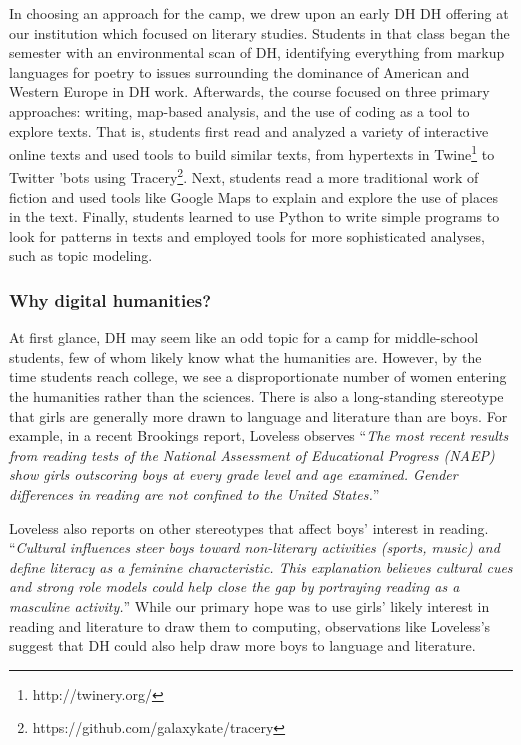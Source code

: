 In choosing an approach for the camp, we drew upon an early DH
DH offering at our institution which focused on literary studies.
Students in that class began the semester with an
environmental scan of DH, identifying everything
from markup languages for poetry to issues surrounding the dominance
of American and Western Europe in DH work. Afterwards, the
course focused on three primary approaches: writing, map-based
analysis, and the use of coding as a tool to explore texts.  That
is, students first read and analyzed a variety of interactive online
texts and used tools to build similar texts, from hypertexts in
Twine\footnote{http://twinery.org/} to Twitter 'bots using
Tracery\footnote{https://github.com/galaxykate/tracery}.  Next,
students read a more traditional work of fiction and used tools
like Google Maps to explain and explore the use of places in the
text.  Finally, students learned to use Python to write simple
programs to look for patterns in texts and employed tools for more
sophisticated analyses, such as topic modeling.

\subsubsection{Why digital humanities?}

At first glance, DH may seem like an odd topic
for a camp for middle-school students, few of whom likely know what
the humanities are.  However, by the time students reach college,
we see a disproportionate number of women entering the
humanities rather than the sciences.  There is also a long-standing
stereotype that girls are generally more drawn to language and literature
than are boys.  For example, in a recent Brookings report, Loveless \cite{Loveless2015} observes ``\textit{The most recent results from reading tests of the National Assessment of Educational Progress (NAEP) show girls outscoring boys at every grade level and age examined. Gender differences in reading are not confined to the United States.}''

Loveless also reports on other stereotypes that affect
boys' interest in reading.
``\textit{Cultural influences steer boys
toward non-literary activities (sports, music) and define literacy
as a feminine characteristic. This explanation believes cultural
cues and strong role models could help close the gap by portraying
reading as a masculine activity.}''
While our primary hope was to use girls' likely interest in reading
and literature to draw them to computing, observations like Loveless's
suggest that DH could also help draw more boys to language and
literature.


